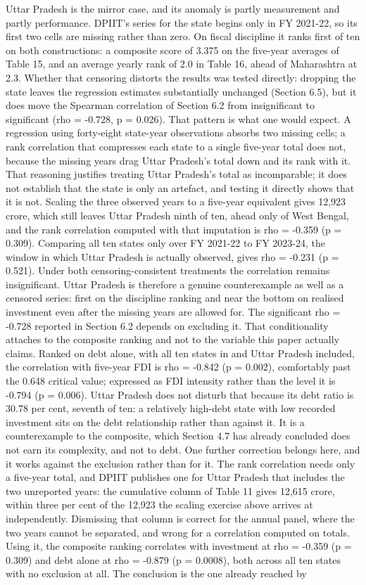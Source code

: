 \documentclass[12pt,a4paper]{article}
\begin{document}
Uttar Pradesh is the mirror case, and its anomaly is partly measurement and partly performance. DPIIT's series for the state begins only in FY 2021-22, so its first two cells are missing rather than zero. On fiscal discipline it ranks first of ten on both constructions: a composite score of 3.375 on the five-year averages of Table 15, and an average yearly rank of 2.0 in Table 16, ahead of Maharashtra at 2.3. Whether that censoring distorts the results was tested directly: dropping the state leaves the regression estimates substantially unchanged (Section 6.5), but it does move the Spearman correlation of Section 6.2 from insignificant to significant (rho = -0.728, p = 0.026). That pattern is what one would expect. A regression using forty-eight state-year observations absorbs two missing cells; a rank correlation that compresses each state to a single five-year total does not, because the missing years drag Uttar Pradesh's total down and its rank with it. That reasoning justifies treating Uttar Pradesh's total as incomparable; it does not establish that the state is only an artefact, and testing it directly shows that it is not. Scaling the three observed years to a five-year equivalent gives 12,923 crore, which still leaves Uttar Pradesh ninth of ten, ahead only of West Bengal, and the rank correlation computed with that imputation is rho = -0.359 (p = 0.309). Comparing all ten states only over FY 2021-22 to FY 2023-24, the window in which Uttar Pradesh is actually observed, gives rho = -0.231 (p = 0.521). Under both censoring-consistent treatments the correlation remains insignificant. Uttar Pradesh is therefore a genuine counterexample as well as a censored series: first on the discipline ranking and near the bottom on realised investment even after the missing years are allowed for. The significant rho = -0.728 reported in Section 6.2 depends on excluding it. That conditionality attaches to the composite ranking and not to the variable this paper actually claims. Ranked on debt alone, with all ten states in and Uttar Pradesh included, the correlation with five-year FDI is rho = -0.842 (p = 0.002), comfortably past the 0.648 critical value; expressed as FDI intensity rather than the level it is -0.794 (p = 0.006). Uttar Pradesh does not disturb that because its debt ratio is 30.78 per cent, seventh of ten: a relatively high-debt state with low recorded investment sits on the debt relationship rather than against it. It is a counterexample to the composite, which Section 4.7 has already concluded does not earn its complexity, and not to debt. One further correction belongs here, and it works against the exclusion rather than for it. The rank correlation needs only a five-year total, and DPIIT publishes one for Uttar Pradesh that includes the two unreported years: the cumulative column of Table 11 gives 12,615 crore, within three per cent of the 12,923 the scaling exercise above arrives at independently. Dismissing that column is correct for the annual panel, where the two years cannot be separated, and wrong for a correlation computed on totals. Using it, the composite ranking correlates with investment at rho = -0.359 (p = 0.309) and debt alone at rho = -0.879 (p = 0.0008), both across all ten states with no exclusion at all. The conclusion is the one already reached by 
\end{document}

